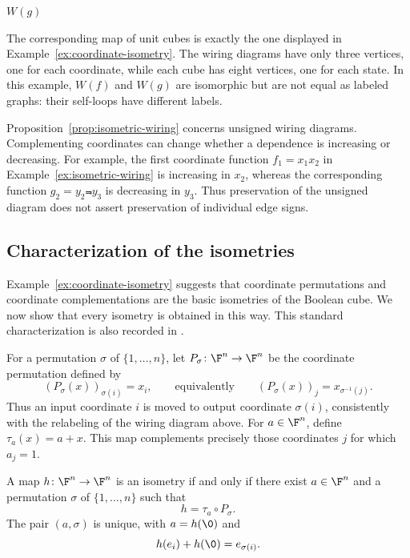 \begin{example}
\begin{center}
\begin{minipage}{0.46\linewidth}
            \small $W(g)$
        \end{minipage}
    \end{center}

    The corresponding map of unit cubes is exactly the one displayed in Example~\ref{ex:coordinate-isometry}. The wiring diagrams have only three vertices, one for each coordinate, while each cube has eight vertices, one for each state. In this example, $W(f)$ and $W(g)$ are isomorphic but are not equal as labeled graphs: their self-loops have different labels.
\end{example}

\begin{remark}
    Proposition~\ref{prop:isometric-wiring} concerns unsigned wiring diagrams. Complementing coordinates can change whether a dependence is increasing or decreasing. For example, the first coordinate function $f_1=x_1x_2$ in Example~\ref{ex:isometric-wiring} is increasing in $x_2$, whereas the corresponding function $g_2=y_2\Not{y}_3$ is decreasing in $y_3$. Thus preservation of the unsigned diagram does not assert preservation of individual edge signs.
\end{remark}

\subsection{Characterization of the isometries}

Example~\ref{ex:coordinate-isometry} suggests that coordinate permutations and coordinate complementations are the basic isometries of the Boolean cube. We now show that every isometry is obtained in this way. This standard characterization is also recorded in \cite{dewinter2016weak}.

For a permutation $\sigma$ of $\{1,\dots,n\}$, let $P_\sigma\colon\F^n\to\F^n$ be the coordinate permutation defined by
\[
    (P_\sigma(x))_{\sigma(i)}=x_i,
    \qquad\text{equivalently}\qquad
    (P_\sigma(x))_j=x_{\sigma^{-1}(j)}.
\]
Thus an input coordinate $i$ is moved to output coordinate $\sigma(i)$, consistently with the relabeling of the wiring diagram above. For $a\in\F^n$, define $\tau_a(x)=a+ x$. This map complements precisely those coordinates $j$ for which $a_j=1$.

\begin{theorem}\label{thm:cube-isometries}
    A map $h\colon\F^n\to\F^n$ is an isometry if and only if there exist $a\in\F^n$ and a permutation $\sigma$ of $\{1,\dots,n\}$ such that
    \[
        h=\tau_a\circ P_\sigma.
    \]
    The pair $(a,\sigma)$ is unique, with $a=h(\0)$ and
    \[
        h(e_i)+ h(\0)=e_{\sigma(i)}.
    \]
\end{theorem}

